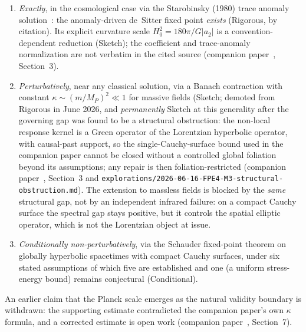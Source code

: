 \documentclass[12pt,a4paper]{article}
\theoremstyle{definition}
\theoremstyle{remark}
\begin{document}
\begin{enumerate}

\item \emph{Exactly}, in the cosmological case via the Starobinsky
(1980) trace anomaly solution~\cite{starobinsky}: the anomaly-driven
de~Sitter fixed point \emph{exists} (Rigorous, by citation). Its
explicit curvature scale $H_0^2 = 180\pi/G|a_2|$ is a
convention-dependent reduction (Sketch); the coefficient and
trace-anomaly normalization are not verbatim in the cited source
(companion paper~\cite{fixed_point}, Section~3).

\item \emph{Perturbatively}, near any classical solution, via a Banach
contraction with constant $\kappa \sim (m/M_P)^2 \ll 1$ for massive
fields (Sketch; demoted from Rigorous in June 2026, and \emph{permanently}
Sketch at this generality after the governing gap was found to be a
structural obstruction: the non-local response kernel is a Green operator of
the Lorentzian hyperbolic operator, with causal-past support, so the
single-Cauchy-surface bound used in the companion paper cannot be closed
without a controlled global foliation beyond its assumptions; any repair is
then foliation-restricted (companion paper~\cite{fixed_point}, Section~3 and
\texttt{explorations/2026-06-16-FPE4-M3-structural-obstruction.md}). The
extension to massless fields is blocked by the \emph{same} structural gap, not
by an independent infrared failure: on a compact Cauchy surface the spectral
gap stays positive, but it controls the spatial elliptic operator, which is
not the Lorentzian object at issue.

\item \emph{Conditionally non-perturbatively}, via the Schauder
fixed-point theorem on globally hyperbolic spacetimes with compact Cauchy
surfaces, under six stated assumptions of which five are established and
one (a uniform stress-energy bound) remains conjectural (Conditional).

\end{enumerate}

An earlier claim that the Planck scale emerges as the natural validity
boundary is withdrawn: the supporting estimate contradicted the companion
paper's own $\kappa$ formula, and a corrected estimate is open work
(companion paper~\cite{fixed_point}, Section~7).
\end{document}
